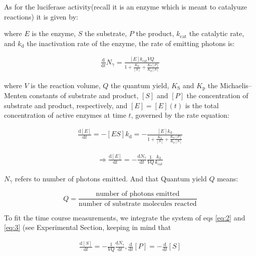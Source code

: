 \documentclass{article}
\begin{document}
As for the luciferase activity(recall it is an enzyme which is meant to catalyuze reactions) it is given by:

where $E$ is the enzyme, $S$ the substrate, $P$ the product, $k_{\text{cat}}$ the catalytic rate, and $k_{\text{d}}$ the inactivation rate of the enzyme, the rate of emitting photons is:

\begin{align*}
\frac{\text{d}}{\text{d}t} N_{\gamma} = \frac{[E]k_{\text{cat}}VQ}{1 + \frac{K_{\text{S}}}{[S]} + \frac{K_{\text{S}} [P]}{K_{\text{p}} [S]}} \tag{2}\label{eq:2}
\end{align*}

where $V$ is the reaction volume, $Q$ the quantum yield, $K_{\text{S}}$ and $K_{\text{p}}$ the Michaelis--Menten constants of substrate and product, $[S]$ and $[P]$ the concentration of substrate and product, respectively, and $[E] = [E](t)$ is the total concentration of active enzymes at time $t$, governed by the rate equation:

\begin{align*}
\frac{\text{d}[E]}{\text{d}t} = -[ES]k_{\text{d}} = -\frac{[E]k_{\text{d}}}{1 + \frac{K_{\text{S}}}{[S]} + \frac{K_{\text{S}} [P]}{K_{\text{p}} [S]}} \tag{3}\label{eq:3}
\end{align*}

\begin{align*}
\Rightarrow \frac{\text{d}[E]}{\text{d}t} = -\frac{\text{d}N_{\gamma}}{\text{d}t} \frac{1}{VQ} \frac{k_{\text{d}}}{k_{\text{cat}}} \tag{4}\label{eq:4}
\end{align*}
\begin{definition}
 $N_\gamma $  refers to number of photons emitted. And that Quantum yield $Q$ means:

\begin{equation*}
Q = \frac{\text{number of photons emitted}}{\text{number of substrate molecules reacted}}
\end{equation*}
\end{definition}


To fit the time course measurements, we integrate the system of eqs \ref{eq:2} and \ref{eq:3} (see Experimental Section, keeping in mind that

\begin{align*}
\frac{\text{d}[S]}{\text{d}t} = -\frac{1}{VQ} \frac{\text{d}N_{\gamma}}{\text{d}t}, \frac{\text{d}}{\text{d}t}[P] = -\frac{\text{d}}{\text{d}t}[S] \tag{5}\label{eq:5}
\end{align*}
\end{document}
